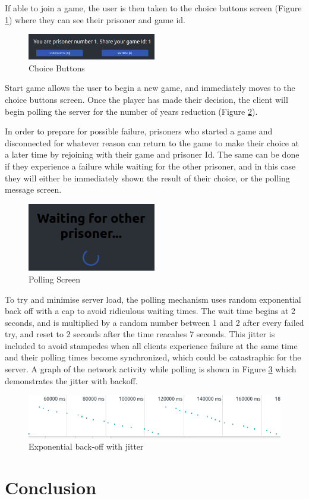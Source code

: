 \documentclass[12pt]{article}
\begin{document}
If able to join a game, the user is then taken to the choice buttons screen (Figure \ref{fig:makechoice}) where they can see their prisoner and game id.

\begin{figure}[!ht]
        \centering
        \includegraphics[width=0.5\textwidth]{images/makechoice} %
        \caption{Choice Buttons}
        \label{fig:makechoice}
\end{figure}

Start game allows the user to begin a new game, and immediately moves to the choice buttons screen. Once the player has made their decision, the client will begin polling the server for the number of years reduction (Figure \ref{fig:polling}). 

In order to prepare for possible failure, prisoners who started a game and disconnected for whatever reason can return to the game to make their choice at a later time by rejoining with their game and prisoner Id. The same can be done if they experience a failure while waiting for the other prisoner, and in this case they will either be immediately shown the result of their choice, or the polling message screen.

\begin{figure}[!ht]
        \centering
        \includegraphics[width=0.5\textwidth]{images/polling} %
        \caption{Polling Screen}
        \label{fig:polling}
\end{figure}

To try and minimise server load, the polling mechanism uses random exponential back off with a cap to avoid ridiculous waiting times. The wait time begins at 2 seconds, and is multiplied by a random number between 1 and 2 after every failed try, and reset to 2 seconds after the time reacahes 7 seconds. This jitter is included to avoid stampedes when all clients experience failure at the same time and their polling times become synchronized, which could be catastraphic for the server. A graph of the network activity while polling is shown in Figure \ref{fig:jitter} which demonstrates the jitter with backoff.

\begin{figure}[!ht]
        \centering
        \includegraphics[width=\textwidth]{images/jitter} %
        \caption{Exponential back-off with jitter}
        \label{fig:jitter}
\end{figure}

\part*{Conclusion}



\end{document}
